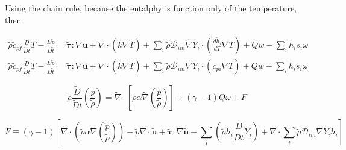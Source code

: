 \documentclass[preprint,12pt,authoryear]{elsarticle}
\begin{document}
Using the chain rule, because the entalphy is function only of the temperature, then 

\begin{equation}
\begin{split}
        \tilde{\rho}
        \tilde{c}_{pf}
        \frac{\tilde{D}}{\tilde{D} t}
        \tilde{T}
        -
        \frac{D \tilde{p}}{D\tilde{t}}
        =
        \pmb{\tilde{\tau}}:\tilde{\nabla} \tilde{\mathbf{u}} 
        + 
        \tilde{\nabla} \cdot (\tilde{k}\tilde{\nabla} \tilde{T})
        +
        \sum\limits_i 
        \tilde{\rho}
        \mathcal{D}_{im}
        \tilde{\nabla}
        \tilde{Y}_i     
        \cdot
        \left(
        \frac{d \tilde{h}_i}{ d T}
        \tilde{\nabla}T 
        \right)
	+
	Qw
	-
        \sum\limits_i
	\tilde{h}_i
        s_i \omega	
\\
        \tilde{\rho}
        \tilde{c}_{pf}
        \frac{\tilde{D}}{\tilde{D} t}
        \tilde{T}
        -
        \frac{D \tilde{p}}{D\tilde{t}}
        =
        \pmb{\tilde{\tau}}:\tilde{\nabla} \tilde{\mathbf{u}} 
        + 
        \tilde{\nabla} \cdot (\tilde{k}\tilde{\nabla} \tilde{T})
        +
        \sum\limits_i 
        \tilde{\rho}
        \mathcal{D}_{im}
        \tilde{\nabla}
        \tilde{Y}_i     
        \cdot
        \left(
        c_{pi}
        \tilde{\nabla}T 
        \right)
	+
	Qw
	-
        \sum\limits_i
	\tilde{h}_i
        s_i \omega	
%      
\end{split}
\end{equation}


\begin{equation}
         \tilde{\rho}  
         \frac{\tilde{D} } {\tilde{D}\tilde{t} }
         (\frac{ \tilde{p}}{ \tilde{\rho}})
        = 
		\tilde{\nabla} \cdot 
			\left[ \tilde{\rho} \alpha
		\tilde{\nabla} (\frac{ \tilde{p} }{  \tilde{\rho} } )\right]
                +
        (\gamma - 1) Q \omega
        +
        F
\label{eqp}
\end{equation}

\begin{equation}
    F \equiv 
            (\gamma - 1)
        \left[
        \tilde{\nabla} \cdot 
		\left( 
		\tilde{\rho} \alpha
		\tilde{\nabla} (\frac{ \tilde{p} }{  \tilde{\rho} } )
		\right)
        -
        \tilde{p}  \tilde{\nabla} \cdot \tilde{\mathbf{u}}
		 +
        \pmb{\tilde{\tau}}:\tilde{\nabla} \tilde{\mathbf{u}} 
        -
        \sum\limits_i
        \left(
                 \tilde{\rho}\tilde{h}_i
                \frac{D}{Dt}
		\tilde{Y}_i
		\right)
        +
        \tilde{\nabla} \cdot
        \sum\limits_i 
        \tilde{\rho}\mathcal{D}_{im}\tilde{\nabla}\tilde{Y}_i     
        \tilde{h}_i
        \right]
\label{eqF}
\end{equation}
\end{document}
